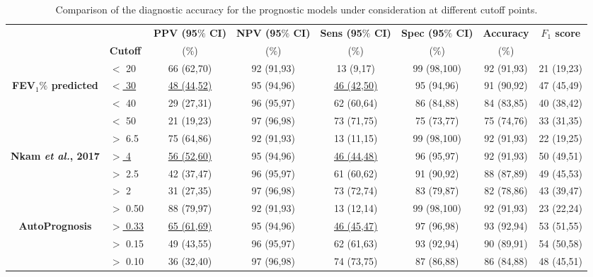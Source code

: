 \documentclass [PhD] {uclathes}
\begin{document}
\begin{table}
\centering
\begin{tabular}{clcccccc}
 &  & {\small {\bf PPV (95$\%$ CI)}} & {\small {\bf NPV (95$\%$ CI)}} & {\small {\bf Sens (95$\%$ CI)}} & {\small {\bf Spec (95$\%$ CI)}}& {\bf Accuracy} & {\bf $F_1$ score} \\
 & {\small {\bf Cutoff}} & {\small ($\%$)} & {\small ($\%$)} & {\small ($\%$)} & {\small ($\%$)} & {\small ($\%$)} & \\
\hline
\hline
 & {\small $<$ 20} & {\small 66 (62,70)} & {\small 92 (91,93)} & {\small 13 (9,17)} & {\small 99 (98,100)} & {\small 92 (91,93)} & {\small 21 (19,23)}  \\
{\small \bf FEV$_1\%$ predicted} & \underline{{\small $<$ 30}} & \underline{{\small 48 (44,52)}} & {\small 95 (94,96)} & \underline{{\small 46 (42,50)}} & {\small 95 (94,96)} & {\small 91 (90,92)} & {\small 47 (45,49)} \\
 & {\small $<$ 40} & {\small 29 (27,31)} & {\small 96 (95,97)} & {\small 62 (60,64)} & {\small 86 (84,88)} & {\small 84 (83,85)} & {\small 40 (38,42)}  \\
 & {\small $<$ 50} & {\small 21 (19,23)} & {\small 97 (96,98)} & {\small 73 (71,75)} & {\small 75 (73,77)} & {\small 75 (74,76)} & {\small 33 (31,35)} \\
\hline
& {\small $>$ 6.5} & {\small 75 (64,86)} & {\small 92 (91,93)} & {\small 13 (11,15)} & {\small 99 (98,100)} & {\small 92 (91,93)} & {\small 22 (19,25)} \\
{\small \bf Nkam {\it et al.}, 2017} & \underline{{\small $>$ 4}} & \underline{{\small 56 (52,60)}} & {\small 95 (94,96)} & \underline{{\small 46 (44,48)}} & {\small 96 (95,97)} & {\small 92 (91,93)} & {\small 50 (49,51)} \\
& {\small $>$ 2.5} & {\small 42 (37,47)} & {\small 96 (95,97)} & {\small 61 (60,62)} & {\small 91 (90,92)} & {\small 88 (87,89)} & {\small 49 (45,53)} \\
& {\small $>$ 2} & {\small 31 (27,35)} & {\small 97 (96,98)} & {\small 73 (72,74)} & {\small 83 (79,87)} & {\small 82 (78,86)} & {\small 43 (39,47)} \\
\hline
 & {\small $>$ 0.50} & {\small 88 (79,97)} & {\small 92 (91,93)} & {\small 13 (12,14)} & {\small 99 (98,100)} & {\small 92 (91,93)} & {\small 23 (22,24)} \\
{\small \bf AutoPrognosis} & {\small \underline{$>$ 0.33}} & \underline{{\small 65 (61,69)}} & {\small 95 (94,96)} & \underline{{\small 46 (45,47)}} & {\small 97 (96,98)} & {\small 93 (92,94)} & {\small 53 (51,55)} \\
 & {\small $>$ 0.15} & {\small 49 (43,55)} & {\small 96 (95,97)} & {\small 62 (61,63)} & {\small 93 (92,94)} & {\small 90 (89,91)} & {\small 54 (50,58)}  \\
 & {\small $>$ 0.10} & {\small 36 (32,40)} & {\small 97 (96,98)} & {\small 74 (73,75)} & {\small 87 (86,88)} & {\small 86 (84,88)} & {\small 48 (45,51)} \\
\end{tabular}
\caption{Comparison of the diagnostic accuracy for the prognostic models under consideration at different cutoff points.}
\label{ch6Table4}
\end{table}
\end{document}
